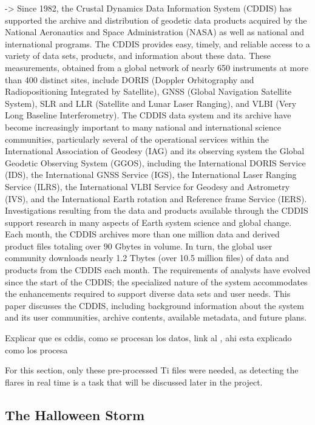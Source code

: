 \cite{noll2010crustal} -> Since 1982, the Crustal Dynamics Data Information System (CDDIS) has supported the archive and distribution of geodetic data products acquired by the National Aeronautics and Space Administration (NASA) as well as national and international programs. The CDDIS provides easy, timely, and reliable access to a variety of data sets, products, and information about these data. These measurements, obtained from a global network of nearly 650 instruments at more than 400 distinct sites, include DORIS (Doppler Orbitography and Radiopositioning Integrated by Satellite), GNSS (Global Navigation Satellite System), SLR and LLR (Satellite and Lunar Laser Ranging), and VLBI (Very Long Baseline Interferometry). The CDDIS data system and its archive have become increasingly important to many national and international science communities, particularly several of the operational services within the International Association of Geodesy (IAG) and its observing system the Global Geodetic Observing System (GGOS), including the International DORIS Service (IDS), the International GNSS Service (IGS), the International Laser Ranging Service (ILRS), the International VLBI Service for Geodesy and Astrometry (IVS), and the International Earth rotation and Reference frame Service (IERS). Investigations resulting from the data and products available through the CDDIS support research in many aspects of Earth system science and global change. Each month, the CDDIS archives more than one million data and derived product files totaling over 90 Gbytes in volume. In turn, the global user community downloads nearly 1.2 Tbytes (over 10.5 million files) of data and products from the CDDIS each month. The requirements of analysts have evolved since the start of the CDDIS; the specialized nature of the system accommodates the enhancements required to support diverse data sets and user needs. This paper discusses the CDDIS, including background information about the system and its user communities, archive contents, available metadata, and future plans.


Explicar que es cddis, como se procesan los datos, link al \cite{hernandez2009igs}, ahi esta explicado como los procesa

For this section, only these pre-processed Ti files were needed, as detecting the flares in real time is a task that will be discussed later in the project.

\subsection{The Halloween Storm}

